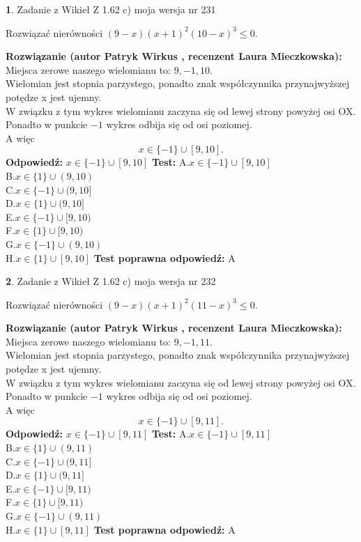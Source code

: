 \documentclass[12pt, a4paper]{article}
\theoremstyle{definition} %
\newtheorem{zad}{}
\newcommand{\zadStart}[1]{\begin{zad}#1\newline}
\newcommand{\zadStop}{\end{zad}}
\newcommand{\rozwStart}[2]{\noindent \textbf{Rozwiązanie (autor #1 , recenzent #2): }\newline}
\newcommand{\rozwStop}{\newline}
\newcommand{\odpStart}{\noindent \textbf{Odpowiedź:}\newline}
\newcommand{\odpStop}{\newline}
\newcommand{\testStart}{\noindent \textbf{Test:}\newline}
\newcommand{\testStop}{\newline}
\newcommand{\kluczStart}{\noindent \textbf{Test poprawna odpowiedź:}\newline}
\newcommand{\kluczStop}{\newline}
\begin{document}
\zadStart{Zadanie z Wikieł Z 1.62 c) moja wersja nr 231}

Rozwiązać nierówności $(9-x)(x+1)^{2}(10-x)^{3}\le0$.
\zadStop
\rozwStart{Patryk Wirkus}{Laura Mieczkowska}
Miejsca zerowe naszego wielomianu to: $9, -1, 10$.\\
Wielomian jest stopnia parzystego, ponadto znak współczynnika przy\linebreak najwyższej potędze x jest ujemny.\\ W związku z tym wykres wielomianu zaczyna się od lewej strony powyżej osi OX.\\
Ponadto w punkcie $-1$ wykres odbija się od osi poziomej.\\
A więc $$x \in \{-1\} \cup [9,10].$$
\rozwStop
\odpStart
$x \in \{-1\} \cup [9,10]$
\odpStop
\testStart
A.$x \in \{-1\} \cup [9,10]$\\
B.$x \in \{1\} \cup (9,10)$\\
C.$x \in \{-1\} \cup (9,10]$\\
D.$x \in \{1\} \cup (9,10]$\\
E.$x \in \{-1\} \cup [9,10)$\\
F.$x \in \{1\} \cup [9,10)$\\
G.$x \in \{-1\} \cup (9,10)$\\
H.$x \in \{1\} \cup [9,10]$
\testStop
\kluczStart
A
\kluczStop



\zadStart{Zadanie z Wikieł Z 1.62 c) moja wersja nr 232}

Rozwiązać nierówności $(9-x)(x+1)^{2}(11-x)^{3}\le0$.
\zadStop
\rozwStart{Patryk Wirkus}{Laura Mieczkowska}
Miejsca zerowe naszego wielomianu to: $9, -1, 11$.\\
Wielomian jest stopnia parzystego, ponadto znak współczynnika przy\linebreak najwyższej potędze x jest ujemny.\\ W związku z tym wykres wielomianu zaczyna się od lewej strony powyżej osi OX.\\
Ponadto w punkcie $-1$ wykres odbija się od osi poziomej.\\
A więc $$x \in \{-1\} \cup [9,11].$$
\rozwStop
\odpStart
$x \in \{-1\} \cup [9,11]$
\odpStop
\testStart
A.$x \in \{-1\} \cup [9,11]$\\
B.$x \in \{1\} \cup (9,11)$\\
C.$x \in \{-1\} \cup (9,11]$\\
D.$x \in \{1\} \cup (9,11]$\\
E.$x \in \{-1\} \cup [9,11)$\\
F.$x \in \{1\} \cup [9,11)$\\
G.$x \in \{-1\} \cup (9,11)$\\
H.$x \in \{1\} \cup [9,11]$
\testStop
\kluczStart
A
\kluczStop
\end{document}
